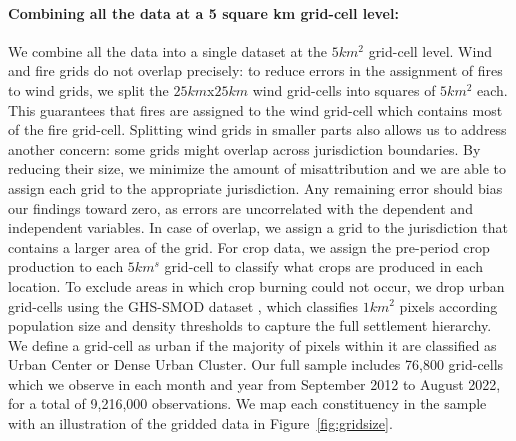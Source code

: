 \documentclass[12pt]{article}
\begin{document}
\paragraph{Combining all the data at a 5 square km grid-cell level:}
We combine all the data into a single dataset at the $5km^2$ grid-cell level. Wind and fire grids do not overlap precisely: to reduce errors in the assignment of fires to wind grids, we split the $25km$x$25km$ wind grid-cells into squares of $5km^2$ each. This guarantees that fires are assigned to the wind grid-cell which contains most of the fire grid-cell. Splitting wind grids in smaller parts also allows us to address another concern: some grids might overlap across jurisdiction boundaries. By reducing their size, we minimize the amount of misattribution and we are able to assign each grid to the appropriate jurisdiction. Any remaining error should bias our findings toward zero, as errors are uncorrelated with the dependent and independent variables. In case of overlap, we assign a grid to the jurisdiction that contains a larger area of the grid. For crop data, we assign the pre-period crop production to each $5km^s$ grid-cell to classify what crops are produced in each location.  To exclude areas in which crop burning could not occur, we drop urban grid-cells using the GHS-SMOD dataset \citep{schiavina2026ghssmod}, which classifies $1km^2$ pixels according population size and density thresholds to capture the full settlement hierarchy. We define a grid-cell as urban if the majority of pixels within it are classified as Urban Center or Dense Urban Cluster.
Our full sample includes 76,800 grid-cells which we observe in each month and year from September 2012 to August 2022, for a total of 9,216,000 observations. We map each constituency in the sample with an illustration of the gridded data in Figure~\ref{fig:gridsize}.
\end{document}
